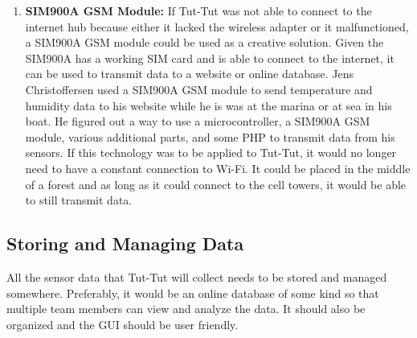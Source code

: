 \documentclass[letterpaper,10pt,draftclsnofoot,onecolumn]{article}
\begin{document}
\begin{enumerate}
    \item \textbf{SIM900A GSM Module:} If Tut-Tut was not able to connect to the internet hub because either it lacked the wireless adapter or it malfunctioned, a SIM900A GSM module could be used as a creative solution. Given the SIM900A has a working SIM card and is able to connect to the internet, it can be used to transmit data to a website or online database. Jens Christoffersen used a SIM900A GSM module to send temperature and humidity data to his website while he is was at the marina or at sea in his boat. He figured out a way to use a microcontroller, a SIM900A GSM module, various additional parts, and some PHP to transmit data from his sensors. \cite{jens} If this technology was to be applied to Tut-Tut, it would no longer need to have a constant connection to Wi-Fi. It could be placed in the middle of a forest and as long as it could connect to the cell towers, it would be able to still transmit data.
\end{enumerate}

\subsection{Storing and Managing Data}
All the sensor data that Tut-Tut will collect needs to be stored and managed somewhere. Preferably, it would be an online database of some kind so that multiple team members can view and analyze the data. It should also be organized and the GUI should be user friendly. 
\end{document}
